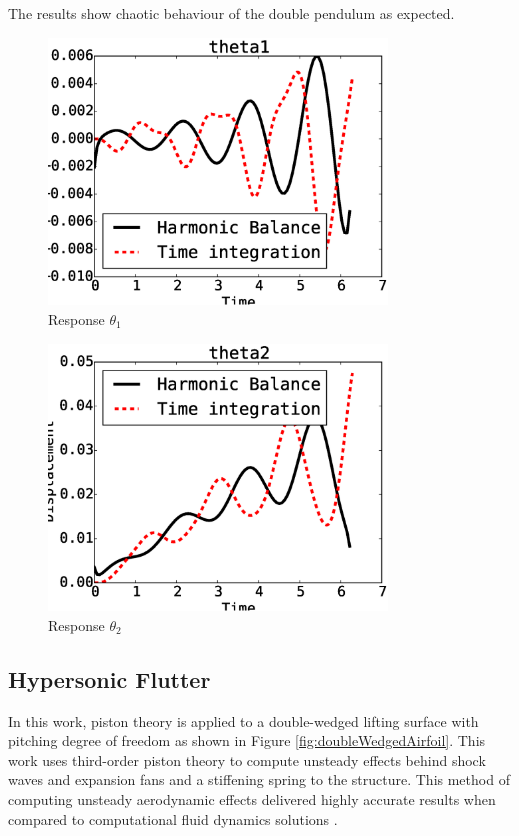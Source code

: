 \documentclass[12pt, a4paper]{extarticle}
\begin{document}
The results show chaotic behaviour of the double pendulum as expected.
\begin{figure}[H]
	\centering
	\includegraphics[width=9.00cm]{figure/figure_1.eps}
	\caption{Response $\theta_1$ }
	\label{fig:theta1}
\end{figure}
\begin{figure}[H]
	\centering
	\includegraphics[width=9.00cm]{figure/figure_2.eps}
	\caption{Response  $\theta_2$  }
	\label{fig:theta2}
\end{figure}



\subsection{Hypersonic Flutter}
In this work, piston theory \cite{ashley2012piston} is applied to a double-wedged lifting surface with pitching degree of freedom as shown in Figure \ref{fig:doubleWedgedAirfoil}. This work uses third-order piston theory to compute unsteady effects behind shock waves and expansion fans and a stiffening spring to the structure. This method of computing unsteady aerodynamic effects delivered highly accurate results when compared to computational fluid dynamics solutions \cite{mcnamara2011aeroelastic}.
\end{document}
